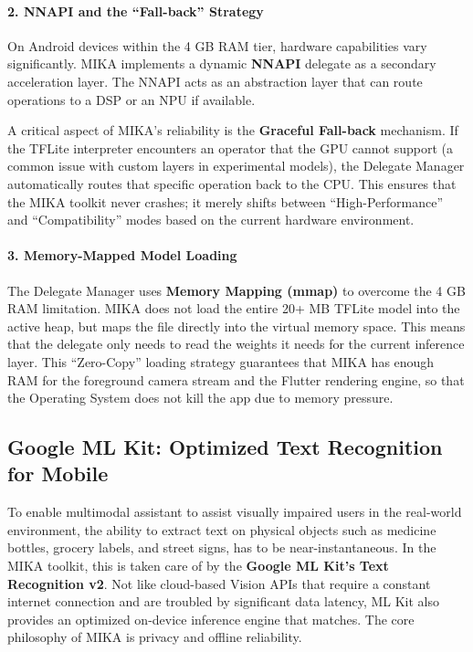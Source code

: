 \documentclass[12pt,a4paper]{report}
\begin{document}
\paragraph{2. NNAPI and the ``Fall-back'' Strategy}
On Android devices within the 4 GB RAM tier, hardware capabilities vary significantly. MIKA implements a dynamic \textbf{NNAPI} delegate as a secondary acceleration layer. The NNAPI acts as an abstraction layer that can route operations to a DSP or an NPU if available.
 
\noindent A critical aspect of MIKA's reliability is the \textbf{Graceful Fall-back} mechanism. If the TFLite interpreter encounters an operator that the GPU cannot support (a common issue with custom layers in experimental models), the Delegate Manager automatically routes that specific operation back to the CPU. This ensures that the MIKA toolkit never crashes; it merely shifts between ``High-Performance'' and ``Compatibility'' modes based on the current hardware environment.
 
\paragraph{3. Memory-Mapped Model Loading}
The Delegate Manager uses \textbf{Memory Mapping (mmap)} to overcome the 4 GB RAM limitation. MIKA does not load the entire 20+ MB TFLite model into the active heap, but maps the file directly into the virtual memory space. This means that the delegate only needs to read the weights it needs for the current inference layer.
This “Zero-Copy” loading strategy guarantees that MIKA has enough RAM for the foreground camera stream and the Flutter rendering engine, so that the Operating System does not kill the app due to memory pressure.

\subsection{Google ML Kit: Optimized Text Recognition for Mobile}
 
To enable multimodal assistant to assist visually impaired users in the real-world environment, the ability to extract text on physical objects such as medicine bottles, grocery labels, and street signs, has to be near-instantaneous. In the MIKA toolkit, this is taken care of by the \textbf{Google ML Kit's Text Recognition v2}. Not like cloud-based Vision APIs that require a constant internet connection and are troubled by significant data latency, ML Kit also provides an optimized on-device inference engine that matches. The core philosophy of MIKA is privacy and offline reliability.
\end{document}
